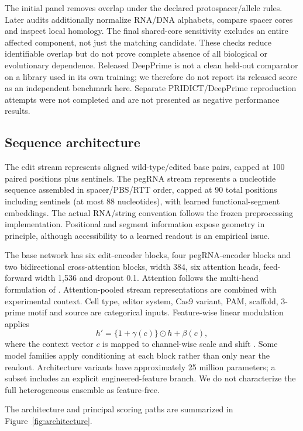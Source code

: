 The initial panel removes overlap under the declared protospacer/allele rules. Later audits additionally normalize RNA/DNA alphabets, compare spacer cores and inspect local homology. The final shared-core sensitivity excludes an entire affected component, not just the matching candidate. These checks reduce identifiable overlap but do not prove complete absence of all biological or evolutionary dependence. Released DeepPrime is not a clean held-out comparator on a library used in its own training; we therefore do not report its released score as an independent benchmark here. Separate PRIDICT/DeepPrime reproduction attempts were not completed and are not presented as negative performance results.

\subsection{Sequence architecture}
The edit stream represents aligned wild-type/edited base pairs, capped at 100 paired positions plus sentinels. The pegRNA stream represents a nucleotide sequence assembled in spacer/PBS/RTT order, capped at 90 total positions including sentinels (at most 88 nucleotides), with learned functional-segment embeddings. The actual RNA/string convention follows the frozen preprocessing implementation. Positional and segment information expose geometry in principle, although accessibility to a learned readout is an empirical issue.

The base network has six edit-encoder blocks, four pegRNA-encoder blocks and two bidirectional cross-attention blocks, width 384, six attention heads, feed-forward width 1,536 and dropout 0.1. Attention follows the multi-head formulation of \citet{vaswani2017}. Attention-pooled stream representations are combined with experimental context. Cell type, editor system, Cas9 variant, PAM, scaffold, 3-prime motif and source are categorical inputs. Feature-wise linear modulation applies
\begin{equation}
 h'=\{1+\gamma(c)\}\odot h+\beta(c),
\end{equation}
where the context vector $c$ is mapped to channel-wise scale and shift \citep{perez2018}. Some model families apply conditioning at each block rather than only near the readout. Architecture variants have approximately 25 million parameters; a subset includes an explicit engineered-feature branch. We do not characterize the full heterogeneous ensemble as feature-free.

The architecture and principal scoring paths are summarized in Figure~\ref{fig:architecture}.

